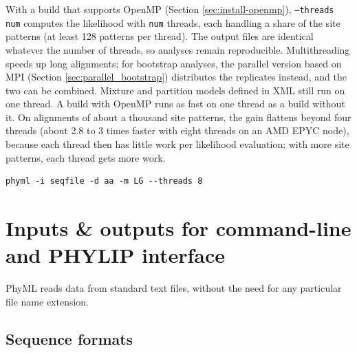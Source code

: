 \documentclass[a4paper,12pt]{article}
\newcommand{\x}[1]{\texttt{#1}}
\begin{document}
With a build that supports OpenMP (Section \ref{sec:install-openmp}), \x{--threads num} computes the
likelihood with \x{num} threads, each handling a share of the site patterns (at least 128 patterns
per thread). The output files are identical whatever the number of threads, so analyses remain
reproducible. Multithreading speeds up long alignments; for bootstrap analyses, the parallel
version based on MPI (Section \ref{sec:parallel_bootstrap}) distributes the replicates instead, and
the two can be combined. Mixture and partition models defined in XML still run on one thread.
A build with OpenMP runs as fast on one thread as a build without it. On alignments of about a
thousand site patterns, the gain flattens beyond four threads (about 2.8 to 3 times faster with
eight threads on an AMD EPYC node), because each thread then has little work per likelihood
evaluation; with more site patterns, each thread gets more work.

\begin{verbatim}
phyml -i seqfile -d aa -m LG --threads 8
\end{verbatim}

\section{Inputs \& outputs for command-line and PHYLIP interface }\label{sec:input_output}

PhyML reads data from standard text files,  without the need for any particular file name extension.

\subsection{Sequence formats}
\end{document}
